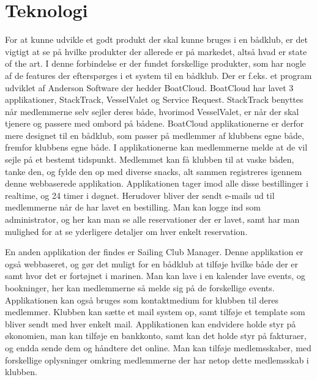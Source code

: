 \chapter{Teknologi}\label{teknologi-analyse}

For at kunne udvikle et godt produkt der skal kunne bruges i en bådklub, er det vigtigt at se på hvilke produkter der
allerede er på markedet, altså hvad er state of the art. I denne forbindelse er der fundet forskellige produkter, som
har nogle af de features der efterspørges i et system til en bådklub. Der er f.eks. et program udviklet af Anderson
Software der hedder BoatCloud.\citep{BoatCloud} BoatCloud har lavet 3 applikationer, StackTrack, VesselValet og Service
Request. StackTrack benyttes når medlemmerne selv sejler deres både, hvorimod VesselValet, er når der skal tjenere og
passere med ombord på bådene. BoatCloud applikationerne er derfor mere designet til en bådklub, som passer på medlemmer
af klubbens egne både, fremfor klubbens egne både. I applikationerne kan medlemmerne melde at de vil sejle på et bestemt
tidspunkt. Medlemmet kan få klubben til at vaske båden, tanke den, og fylde den op med diverse snacks, alt sammen
registreres igennem denne webbaserede applikation. Applikationen tager imod alle disse bestillinger i realtime, og 24
timer i døgnet. Herudover bliver der sendt e-mails ud til medlemmerne når de har lavet en bestilling. Man kan logge ind
som administrator, og her kan man se alle reservationer der er lavet, samt har man mulighed for at se yderligere
detaljer om hver enkelt reservation.

En anden applikation der findes er Sailing Club Manager. \citep{SailClub} Denne applikation er også webbaseret, og gør
det muligt for en bådklub at tilføje hvilke både der er samt hvor det er fortøjnet i marinen. Man kan lave i en kalender
lave events, og bookninger, her kan medlemmerne så melde sig på de forskellige events. Applikationen kan også bruges som
kontaktmedium for klubben til deres medlemmer. Klubben kan sætte et mail system op, samt tilføje et template som bliver
sendt med hver enkelt mail. Applikationen kan endvidere holde styr på økonomien, man kan tilføje en bankkonto, samt kan
det holde styr på fakturaer, og endda sende dem og håndtere det online. Man kan tilføje medlemsskaber, med forskellige
oplysninger omkring medlemmerne der har netop dette medlemsskab i klubben.